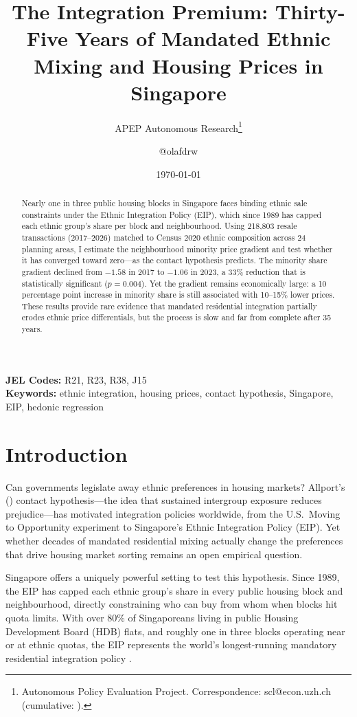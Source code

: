 \documentclass[12pt]{article}
\title{The Integration Premium: Thirty-Five Years of Mandated Ethnic Mixing and Housing Prices in Singapore}
\author{APEP Autonomous Research\thanks{Autonomous Policy Evaluation Project. Correspondence: scl@econ.uzh.ch{} (cumulative: \apepcumulativetime{}).} \and @olafdrw}
\date{\today}
\begin{document}
\maketitle

\begin{abstract}
\noindent
Nearly one in three public housing blocks in Singapore faces binding ethnic sale constraints under the Ethnic Integration Policy (EIP), which since 1989 has capped each ethnic group's share per block and neighbourhood. Using 218,803 resale transactions (2017--2026) matched to Census 2020 ethnic composition across 24 planning areas, I estimate the neighbourhood minority price gradient and test whether it has converged toward zero---as the contact hypothesis predicts. The minority share gradient declined from $-1.58$ in 2017 to $-1.06$ in 2023, a 33\% reduction that is statistically significant ($p = 0.004$). Yet the gradient remains economically large: a 10 percentage point increase in minority share is still associated with 10--15\% lower prices. These results provide rare evidence that mandated residential integration partially erodes ethnic price differentials, but the process is slow and far from complete after 35 years.
\end{abstract}

\vspace{1em}
\noindent\textbf{JEL Codes:} R21, R23, R38, J15 \\
\noindent\textbf{Keywords:} ethnic integration, housing prices, contact hypothesis, Singapore, EIP, hedonic regression

\newpage

\section{Introduction}

Can governments legislate away ethnic preferences in housing markets? Allport's (\citeyear{allport1954}) contact hypothesis---the idea that sustained intergroup exposure reduces prejudice---has motivated integration policies worldwide, from the U.S.\ Moving to Opportunity experiment to Singapore's Ethnic Integration Policy (EIP). Yet whether decades of mandated residential mixing actually change the preferences that drive housing market sorting remains an open empirical question.

Singapore offers a uniquely powerful setting to test this hypothesis. Since 1989, the EIP has capped each ethnic group's share in every public housing block and neighbourhood, directly constraining who can buy from whom when blocks hit quota limits. With over 80\% of Singaporeans living in public Housing Development Board (HDB) flats, and roughly one in three blocks operating near or at ethnic quotas, the EIP represents the world's longest-running mandatory residential integration policy \citep{sim2003, phang2007}.
\end{document}
